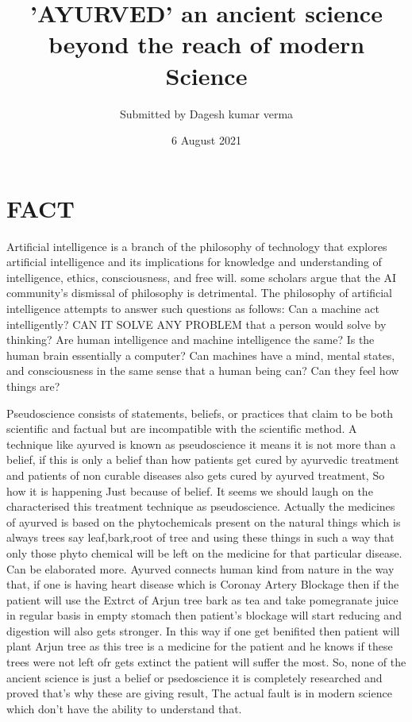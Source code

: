 \documentclass[a4paper]{article}
\title{'AYURVED' an ancient science beyond the reach of modern Science}
\author{Submitted by Dagesh kumar verma}
\date{6 August 2021}
\begin{document}
\maketitle

\section{FACT}
Artificial intelligence is a branch of the philosophy of technology that explores artificial intelligence and its implications for knowledge and understanding of intelligence, ethics, consciousness, and free will. some scholars argue that the AI community’s dismissal of philosophy is detrimental. The philosophy of artificial intelligence attempts to answer such questions as follows: Can a machine act intelligently? CAN IT SOLVE ANY PROBLEM that a person would solve by thinking? Are human intelligence and machine intelligence the same?
Is the human brain essentially a computer? Can machines have a mind, mental states, and consciousness in the same sense that a human being can? Can they feel how things are?

Pseudoscience consists of statements, beliefs, or practices that claim to be both scientific and factual but are incompatible with the scientific method.
A technique like ayurved is known as pseudoscience it means it is not more than a belief, if this is only a belief than how patients get cured by ayurvedic treatment and patients of non curable diseases also gets cured by ayurved treatment, So how it is happening Just because of belief. It seems we should laugh on the characterised this treatment technique as pseudoscience.
Actually the medicines of ayurved is based on the phytochemicals present on the natural things which is always trees say leaf,bark,root of tree and using these things in such a way that only those phyto chemical will be left on the medicine for that particular disease. Can be elaborated more.
Ayurved connects human kind from nature in the way that, if one is having heart disease which is Coronay Artery Blockage then if the patient will use the Extrct of Arjun tree bark as tea and take pomegranate juice in regular basis in empty stomach then patient's blockage will start reducing and digestion will also gets stronger. In this way if one get benifited then patient will plant Arjun tree as this tree is a medicine for the patient and he knows if these trees were not left ofr gets extinct the patient will suffer the most.
So, none of the ancient science is just a belief or psedoscience it is completely researched and proved that's why these are giving result, The actual fault is in modern science which don't have the ability to understand that.     
\end{document}

